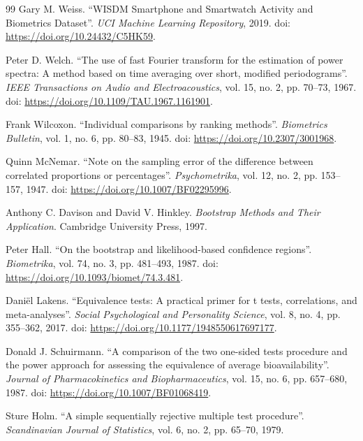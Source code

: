 \documentclass[preprint,12pt]{elsarticle}
\begin{document}
{\begin{thebibliography}{99}
Gary M. Weiss. ``WISDM Smartphone and Smartwatch Activity and Biometrics Dataset''. \textit{UCI Machine Learning Repository}, 2019. doi: \url{https://doi.org/10.24432/C5HK59}.

Peter D. Welch. ``The use of fast Fourier transform for the estimation of power spectra: A method based on time averaging over short, modified periodograms''. \textit{IEEE Transactions on Audio and Electroacoustics}, vol. 15, no. 2, pp. 70--73, 1967. doi: \url{https://doi.org/10.1109/TAU.1967.1161901}.

Frank Wilcoxon. ``Individual comparisons by ranking methods''. \textit{Biometrics Bulletin}, vol. 1, no. 6, pp. 80--83, 1945. doi: \url{https://doi.org/10.2307/3001968}.

Quinn McNemar. ``Note on the sampling error of the difference between correlated proportions or percentages''. \textit{Psychometrika}, vol. 12, no. 2, pp. 153--157, 1947. doi: \url{https://doi.org/10.1007/BF02295996}.

Anthony C. Davison and David V. Hinkley. \textit{Bootstrap Methods and Their Application}. Cambridge University Press, 1997.

Peter Hall. ``On the bootstrap and likelihood-based confidence regions''. \textit{Biometrika}, vol. 74, no. 3, pp. 481--493, 1987. doi: \url{https://doi.org/10.1093/biomet/74.3.481}.

Daniël Lakens. ``Equivalence tests: A practical primer for t tests, correlations, and meta-analyses''. \textit{Social Psychological and Personality Science}, vol. 8, no. 4, pp. 355--362, 2017. doi: \url{https://doi.org/10.1177/1948550617697177}.

Donald J. Schuirmann. ``A comparison of the two one-sided tests procedure and the power approach for assessing the equivalence of average bioavailability''. \textit{Journal of Pharmacokinetics and Biopharmaceutics}, vol. 15, no. 6, pp. 657--680, 1987. doi: \url{https://doi.org/10.1007/BF01068419}.

Sture Holm. ``A simple sequentially rejective multiple test procedure''. \textit{Scandinavian Journal of Statistics}, vol. 6, no. 2, pp. 65--70, 1979.
\end{thebibliography}
}
\end{document}
